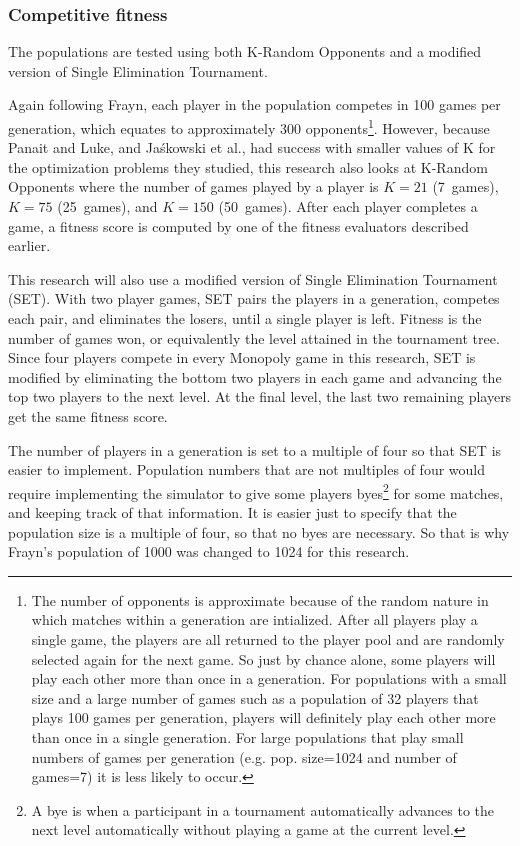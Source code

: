 \subsubsection{Competitive fitness} \label{5_compfit}

The populations are tested using both K-Random Opponents and a modified
version of Single Elimination Tournament.

Again following Frayn, each player in the population competes in 100 games per
generation, which equates to approximately 300 opponents\footnote{The number of
opponents is approximate because of the random nature in which matches within a
generation are intialized. After all players play a single game, the players are
all returned to the player pool and are randomly selected again for the next
game. So just by chance alone, some players will play each other more than once
in a generation. For populations with a small size and a large number of games
such as a population of 32 players that plays 100 games per generation, players
will definitely play each other more than once in a single generation. For large
populations that play small numbers of games per generation (e.g. pop. size=1024
and number of games=7) it is less likely to occur.}. However, because Panait
and Luke, and Ja\'{s}kowski et al., had success with smaller values of K for the
optimization problems they studied, this research also looks at K-Random
Opponents where the number of games played by a player is \(K=21\) (7~games),
\(K=75\) (25~games), and \(K=150\) (50~games). After each player completes a
game, a fitness score is computed by one of the fitness evaluators described
earlier.

This research will also use a modified version of Single Elimination Tournament
(SET). With two player games, SET pairs the players in a generation, competes
each pair, and eliminates the losers, until a single player is left.
Fitness is the number of games won, or equivalently the level attained in the
tournament tree. Since four players compete in every Monopoly game in this
research, SET is modified by eliminating the bottom two players in each game and
advancing the top two players to the next level. At the final level, the last
two remaining players get the same fitness score.

The number of players in a generation is set to a multiple of four so that
SET is easier to implement. Population numbers that are not multiples of
four would require implementing the simulator to give some players
byes\footnote{A bye is when a participant in a tournament automatically
advances to the next level automatically without playing a game at the current
level.} for some matches, and keeping track of that information. It is easier
just to specify that the population size is a multiple of four, so that no byes
are necessary. So that is why Frayn's population of 1000 was changed to 1024 for
this research.

